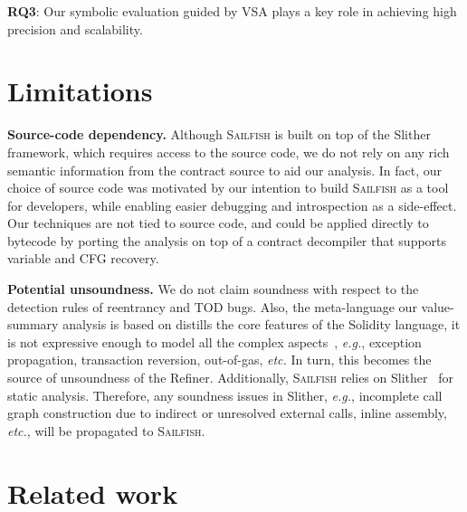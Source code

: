 \documentclass[conference, romanappendices]{tex/IEEEtran}
\theoremstyle{bfnote}
\newcommand{\toolname}{\textsc{Sailfish}\xspace}
\newcommand{\refiner}{{\sc Refiner}\xspace}
\newcommand{\slither}{{\sc Slither}\xspace}
\newcommand{\solidity}{{\sc Solidity}\xspace}
\newcommand{\reentrancy}{{reentrancy}\xspace}
\newcommand{\vsa}{{value-summary analysis}\xspace}
\newcommand{\etc}{\textit{etc.}}
\newcommand{\eg}{\textit{e.g.}}
\begin{document}
\begin{mdframed}[style=graybox]
	\textbf{RQ3}: Our symbolic evaluation guided by VSA plays a key role in achieving high precision and scalability.
\end{mdframed}






 	
\section{Limitations}

\noindent
\textbf{Source-code dependency.}
Although \toolname{} is built on top of the \slither~\cite{slither} framework, which requires access to the source code, we do not rely on any rich semantic information from the contract source to aid our analysis.
In fact, our choice of source code was motivated by our intention to build \toolname{} as a tool for developers, while enabling easier debugging and introspection as a side-effect.
Our techniques are not tied to source code, and could be applied directly to bytecode by porting the analysis on top of a contract decompiler that supports variable and CFG recovery.



\noindent
\textbf{Potential unsoundness.}
We do not claim soundness with respect to the detection rules of \reentrancy and TOD bugs.
Also, the meta-language our \vsa is based on distills the core features of the \solidity language, it is not expressive enough to model all the complex aspects~\cite{Jiao20}, \eg, exception propagation, transaction reversion, out-of-gas, \etc{}
In turn, this becomes the source of unsoundness of the \refiner.
Additionally, \toolname{} relies on \slither~\cite{slither} for static analysis.
Therefore, any soundness issues in \slither{}, \eg, incomplete call graph construction due to indirect or unresolved external calls, inline assembly, \etc, will be propagated to \toolname. 	\section{Related work}
\label{related_works}
\end{document}

